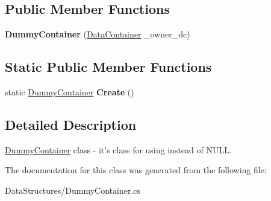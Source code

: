 \subsection*{Public Member Functions}
\begin{DoxyCompactItemize}
\item 
\hypertarget{class_dwarf_d_b_1_1_data_structures_1_1_dummy_container_a62d4c4fe42f254e8c3072bbc4bea6fa2}{
{\bfseries DummyContainer} (\hyperlink{class_dwarf_d_b_1_1_data_structures_1_1_data_container}{DataContainer} \_\-owner\_\-dc)}
\label{class_dwarf_d_b_1_1_data_structures_1_1_dummy_container_a62d4c4fe42f254e8c3072bbc4bea6fa2}

\end{DoxyCompactItemize}
\subsection*{Static Public Member Functions}
\begin{DoxyCompactItemize}
\item 
\hypertarget{class_dwarf_d_b_1_1_data_structures_1_1_dummy_container_a020db8f3d0bd48af1bcfba5d07e6e058}{
static \hyperlink{class_dwarf_d_b_1_1_data_structures_1_1_dummy_container}{DummyContainer} {\bfseries Create} ()}
\label{class_dwarf_d_b_1_1_data_structures_1_1_dummy_container_a020db8f3d0bd48af1bcfba5d07e6e058}

\end{DoxyCompactItemize}


\subsection{Detailed Description}
\hyperlink{class_dwarf_d_b_1_1_data_structures_1_1_dummy_container}{DummyContainer} class -\/ it's class for using instead of NULL. 

The documentation for this class was generated from the following file:\begin{DoxyCompactItemize}
\item 
DataStructures/DummyContainer.cs\end{DoxyCompactItemize}
